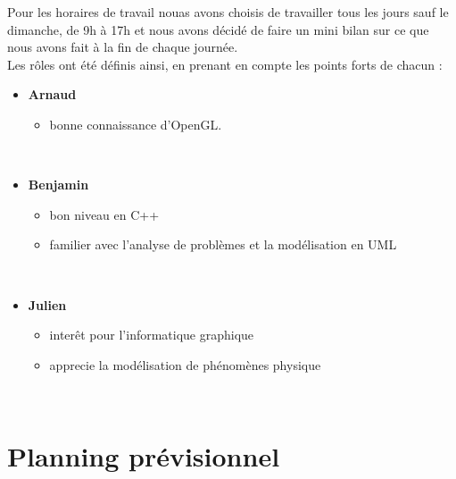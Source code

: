 \documentclass[a4paper,10pt]{article}
\begin{document}
Pour les horaires de travail nouas avons choisis de travailler tous
les jours sauf le dimanche, de 9h à 17h et nous avons décidé de faire
un mini bilan sur ce que nous avons fait à la fin de chaque journée.\\

Les rôles ont été définis ainsi, en prenant en compte les points forts
de chacun :\\

\begin{itemize}

\item \textbf{Arnaud}
\begin{itemize}
\item bonne connaissance d'OpenGL.
\end{itemize}
\quad \\

\item \textbf{Benjamin}
\begin{itemize}
\item bon niveau en C++
\item familier avec l'analyse de problèmes et la modélisation en UML
\end{itemize}
\quad \\

\item \textbf{Julien}
\begin{itemize}
\item interêt pour l'informatique graphique
\item apprecie la modélisation de phénomènes physique
\end{itemize}
\quad \\

\end{itemize}

\section{Planning prévisionnel}
\end{document}
